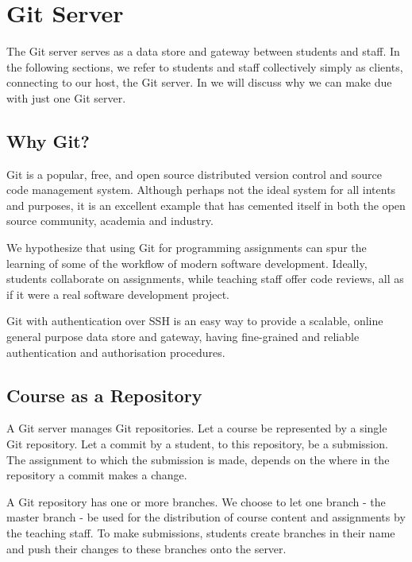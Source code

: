 
\section{Git Server}

The Git server serves as a data store and gateway between students and staff.
In the following sections, we refer to students and staff collectively simply
as clients, connecting to our host, the Git server. In
 we will discuss why we can make due
with just one Git server.

\subsection{Why Git?}

Git is a popular\cite{ohloh-2014}, free, and open source distributed version
control and source code management system\cite{git-2014}. Although perhaps not
the ideal system for all intents and purposes, it is an excellent example that
has cemented itself in both the open source community, academia and
industry\cite{gitprojects-2014}.


We hypothesize that using Git for programming assignments can spur the learning
of some of the workflow of modern software development. Ideally, students
collaborate on assignments, while teaching staff offer code reviews, all as if
it were a real software development project.

Git with authentication over SSH is an easy way to provide a scalable, online
general purpose data store and gateway, having fine-grained and reliable
authentication and authorisation procedures.

\subsection{Course as a Repository}

A Git server manages Git repositories. Let a course be represented by a single
Git repository. Let a commit by a student, to this repository, be a submission.
The assignment to which the submission is made, depends on the where in the
repository a commit makes a change.

A Git repository has one or more branches. We choose to let one branch - the
master branch - be used for the distribution of course content and assignments
by the teaching staff. To make submissions, students create branches in their
name and push their changes to these branches onto the server.

